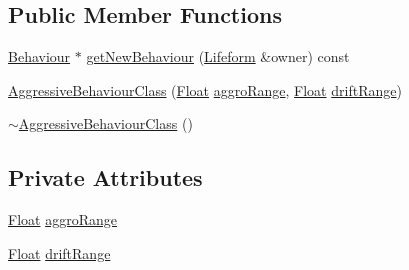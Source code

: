 \subsection*{Public Member Functions}
\begin{DoxyCompactItemize}
\item 
\hyperlink{classZeta_1_1Behaviour}{Behaviour} $\ast$ \hyperlink{classZeta_1_1AggressiveBehaviourClass_a94e8ce28a8c07370b144ac050f447823}{get\+New\+Behaviour} (\hyperlink{classZeta_1_1Lifeform}{Lifeform} \&owner) const 
\item 
\hyperlink{classZeta_1_1AggressiveBehaviourClass_a77d754731d3344ae59021421c5b417a6}{Aggressive\+Behaviour\+Class} (\hyperlink{namespaceZeta_a1e0a1265f9b3bd3075fb0fabd39088ba}{Float} \hyperlink{classZeta_1_1AggressiveBehaviourClass_aeb4248d80fec91bd36a462aee39a8832}{aggro\+Range}, \hyperlink{namespaceZeta_a1e0a1265f9b3bd3075fb0fabd39088ba}{Float} \hyperlink{classZeta_1_1AggressiveBehaviourClass_a86ac42f764b1691c4fc29b215605b5b6}{drift\+Range})
\item 
\hyperlink{classZeta_1_1AggressiveBehaviourClass_a95f3018f93087500afe5bbe1629e79b1}{$\sim$\+Aggressive\+Behaviour\+Class} ()
\end{DoxyCompactItemize}
\subsection*{Private Attributes}
\begin{DoxyCompactItemize}
\item 
\hyperlink{namespaceZeta_a1e0a1265f9b3bd3075fb0fabd39088ba}{Float} \hyperlink{classZeta_1_1AggressiveBehaviourClass_aeb4248d80fec91bd36a462aee39a8832}{aggro\+Range}
\item 
\hyperlink{namespaceZeta_a1e0a1265f9b3bd3075fb0fabd39088ba}{Float} \hyperlink{classZeta_1_1AggressiveBehaviourClass_a86ac42f764b1691c4fc29b215605b5b6}{drift\+Range}
\end{DoxyCompactItemize}


